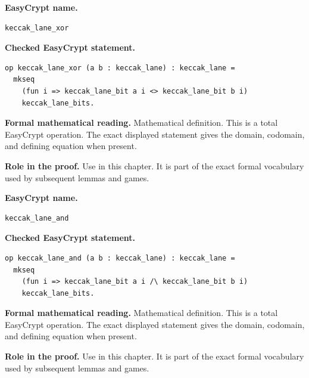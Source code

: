 \begin{formaldefinition}
\noindent\textbf{EasyCrypt name.}
\begin{lstlisting}[language=EasyCrypt,basicstyle=\ttfamily\scriptsize]
keccak_lane_xor
\end{lstlisting}
\noindent\textbf{Checked EasyCrypt statement.}
\begin{lstlisting}[language=EasyCrypt,basicstyle=\ttfamily\scriptsize]
op keccak_lane_xor (a b : keccak_lane) : keccak_lane =
  mkseq
    (fun i => keccak_lane_bit a i <> keccak_lane_bit b i)
    keccak_lane_bits.
\end{lstlisting}
\noindent\textbf{Formal mathematical reading.}
Mathematical definition. This is a total EasyCrypt operation.  The exact displayed statement gives the domain, codomain, and defining equation when present.

\noindent\textbf{Role in the proof.}
Use in this chapter. It is part of the exact formal vocabulary used by subsequent lemmas and games.

\end{formaldefinition}

\begin{formaldefinition}
\noindent\textbf{EasyCrypt name.}
\begin{lstlisting}[language=EasyCrypt,basicstyle=\ttfamily\scriptsize]
keccak_lane_and
\end{lstlisting}
\noindent\textbf{Checked EasyCrypt statement.}
\begin{lstlisting}[language=EasyCrypt,basicstyle=\ttfamily\scriptsize]
op keccak_lane_and (a b : keccak_lane) : keccak_lane =
  mkseq
    (fun i => keccak_lane_bit a i /\ keccak_lane_bit b i)
    keccak_lane_bits.
\end{lstlisting}
\noindent\textbf{Formal mathematical reading.}
Mathematical definition. This is a total EasyCrypt operation.  The exact displayed statement gives the domain, codomain, and defining equation when present.

\noindent\textbf{Role in the proof.}
Use in this chapter. It is part of the exact formal vocabulary used by subsequent lemmas and games.

\end{formaldefinition}

